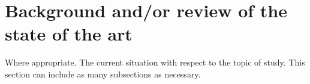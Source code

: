 \chapter{Background and/or review of the state of the art }

Where appropriate. The current situation with respect to the topic of study. This section can include as many subsections as necessary.